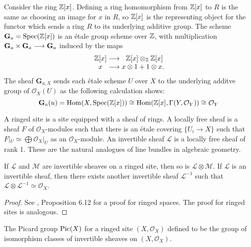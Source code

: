 \begin{construction}
	Consider the ring $\mathbb{Z}[x]$. Defining a ring homomorphism from $\mathbb{Z}[x]$ to $R$ is the same as choosing an image for $x$ in $R$, so $\mathbb{Z}[x]$ is the representing object for the functor which sends a ring $R$ to its underlying additive group.
	The scheme $\mathbf{G}_a = \operatorname{Spec}(\mathbb{Z}[x])$ is an \'etale group scheme over $\mathbb{Z}$, with multiplication $\mathbf{G}_a \times \mathbf{G}_a \longrightarrow \mathbf{G}_a$ induced by the maps
	\[
		\begin{array}{c @{{}\to{}} c @{{}{}} c}
			\Z[x] & \centermathcell{\Z[x]\otimes_\Z \Z[x]}     \\
			x     & \centermathcell{x\otimes 1 + 1 \otimes x}.
		\end{array}
	\]
	The sheaf $\mathbf{G}_{a,X}$ sends each \'etale scheme $U$ over $X$ to the underlying additve group of $\mathcal{O}_X(U)$ as the following calculation shows:
	\[
		\mathbf{G}_a(u) = \operatorname{Hom}(X, \operatorname{Spec}(\mathbb{Z}[x])) \cong \operatorname{Hom}(\mathbb{Z}[x], \Gamma(Y, \mathcal{O}_Y)) \cong \mathcal{O}_Y
	\]
\end{construction}


\begin{definition}
	A ringed site is a site equipped with a sheaf of rings. A locally free sheaf is a sheaf $F$ of $\mathcal{O}_X$-modules such that there is an \'etale covering $\{U_i \to X\}$ such that $F|_U \simeq \bigoplus \mathcal{O}_X|_U$ as an $\mathcal{O}_X$-module. An invertible sheaf $\mathcal{L}$ is a locally free sheaf of rank 1. These are the natural analogues of line bundles in algebraic geometry.
\end{definition}

\begin{proposition}
	If $\mathcal{L}$ and $\mathcal{M}$ are invertible sheaves on a ringed site, then so is $\mathcal{L} \otimes \mathcal{M}$. If $\mathcal{L}$ is an invertible sheaf, then there exists another invertible sheaf $\mathcal{L}^{-1}$ such that $\mathcal{L} \otimes \mathcal{L}^{-1} \simeq \mathcal{O}_X$.
\end{proposition}

\begin{proof}
	See \cite{Hartshorne}, Proposition 6.12 for a proof for ringed spaces. The proof for ringed sites is analogous.
\end{proof}

\begin{proposition}
	The Picard group $\text{Pic}(X)$ for a ringed site $(X, \mathcal{O}_X)$ defined to be the group of isomorphism classes of invertible sheaves on $(X, \mathcal{O}_X)$.
\end{proposition}

